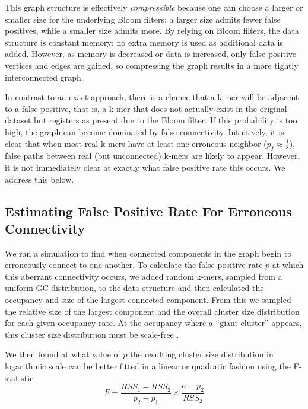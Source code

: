 \documentclass[12pt]{article} \usepackage{simplemargins}
\begin{document}
This graph structure is effectively {\em compressible}
because one can choose a larger
or smaller size for the underlying Bloom filters; a larger size admits fewer
false positives, while a smaller size admits more. By relying on Bloom
filters, the data structure is constant memory: no extra memory is
used as additional data is added. However, as memory is decreased or data
is increased, only false positive vertices and edges are gained, so
compressing the graph results in a more tightly interconnected graph.

In contrast to an exact approach, there is a chance that a k-mer 
will be adjacent to a false positive,
that is, a k-mer
that does not actually exist in the original dataset but registers as present  
due to 
the Bloom filter. If this probability is too high, the 
graph can become dominated by false connectivity. 
Intuitively, it is clear that when most real k-mers
have at least one erroneous neighbor ($p_f \approx \frac{1}{8}$), 
false paths between real (but unconnected) k-mers are likely to 
appear. However, it is not immediately clear at exactly what 
false positive rate this occurs. We address this below.  %

\subsection{Estimating False Positive Rate For Erroneous Connectivity}
We ran a simulation to find when connected components in the graph 
begin to erroneously connect to one another.
To calculate the false positive rate $p$ at which this aberrant 
connectivity occurs, 
we added random k-mers, sampled from a uniform GC distribution, to the data structure 
and then calculated the occupancy and size of 
the largest connected 
component. From this we sampled the relative size of 
the largest component and the overall cluster size distribution for each
given occupancy rate.
At the occupancy where a ``giant cluster'' appears, this cluster size distribution 
must be scale-free \cite{stauffer1979scaling}. 

We then found at what value of $p$ the resulting 
cluster size distribution in logarithmic 
scale can be better fitted in a linear or quadratic fashion using 
the F-statistic
\newline
\newline
\begin{displaymath}
F=\frac{RSS_1-RSS_2}{p_2-p_1} \times \frac{n - p_2}{RSS_2}
\end{displaymath}
\end{document}
